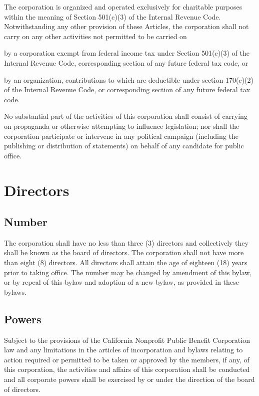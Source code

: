 \documentclass{article}
\begin{document}
	The corporation is organized and operated exclusively for charitable purposes within the meaning of Section 501(c)(3) of the Internal Revenue Code. Notwithstanding any other provision of these Articles, the corporation shall not carry on any other activities not permitted to be carried on 
	\begin{inparaenum}[\itshape 1\upshape)]
		\item by a corporation exempt from federal income tax under Section 501(c)(3) of the Internal Revenue Code, corresponding section of any future federal tax code, or 
		\item by an organization, contributions to which are deductible under section 170(c)(2) of the Internal Revenue Code, or corresponding section of any future federal tax code.
	\end{inparaenum}
	
	No substantial part of the activities of this corporation shall consist of carrying on propaganda or otherwise attempting to influence legislation; nor shall the corporation participate or intervene in any political campaign (including the publishing or distribution of statements) on behalf of any candidate for public office.
	
	\section{Directors}
	\subsection{Number}
	The corporation shall have no less than three (3) directors and collectively they shall be known as the board of directors. The corporation shall not have more than eight (8) directors. All directors shall attain the age of eighteen (18) years prior to taking office. The number may be changed by amendment of this bylaw, or by repeal of this bylaw and adoption of a new bylaw, as provided in these bylaws.
	
	\subsection{Powers}
	Subject to the provisions of the California Nonprofit Public Benefit Corporation law and any limitations in the articles of incorporation and bylaws relating to action required or permitted to be taken or approved by the members, if any, of this corporation, the activities and affairs of this corporation shall be conducted and all corporate powers shall be exercised by or under the direction of the board of directors.
	
\end{document}
